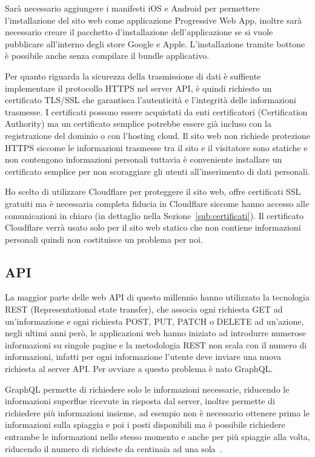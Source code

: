 Sar\`a necessario aggiungere i manifesti iOS e Android per permettere l'installazione del sito web come applicazione Progressive Web App, inoltre sar\`a necessario creare il pacchetto d'installazione dell'applicazione se si vuole pubblicare all'interno degli store Google e Apple. L'installazione tramite bottone \`e possibile anche senza compilare il bundle applicativo.

Per quanto riguarda la sicurezza della trasmissione di dati \`e suffiente implementare il protocollo HTTPS nel server API, \`e quindi richiesto un certificato TLS/SSL che garantisca l'autenticit\`a e l'integrit\`a delle informazioni trasmesse. I certificati possono essere acquistati da enti certificatori (Certification Authority) ma un certificato semplice potrebbe essere gi\`a incluso con la registrazione del dominio o con l'hosting cloud. Il sito web non richiede protezione HTTPS siccome le informazioni trasmesse tra il sito e il visitatore sono statiche e non contengono informazioni personali tuttavia \`e conveniente installare un certificato semplice per non scoraggiare gli utenti all'inserimento di dati personali.

Ho scelto di utilizzare Cloudflare per proteggere il sito web, offre certificati SSL gratuiti ma \`e necessaria completa fiducia in Cloudflare siccome hanno accesso alle comunicazioni in chiaro (in dettaglio nella Sezione~\ref{sub:certificati}). Il certificato Cloudflare verr\`a usato solo per il sito web statico che non contiene informazioni personali quindi non costituisce un problema per noi.

\subsection{API}%
\label{sub:api}

La maggior parte delle web API di questo millennio hanno utilizzato la tecnologia REST (Representational state transfer), che associa ogni richiesta GET ad un'informazione e ogni richiesta POST, PUT, PATCH o DELETE ad un'azione, negli ultimi anni per\`o, le applicazioni web hanno iniziato ad introdurre numerose informazioni su singole pagine e la metodologia REST non scala con il numero di informazioni, infatti per ogni informazione l'utente deve inviare una nuova richiesta al server API\@. Per ovviare a questo problema \`e nato GraphQL\@.

GraphQL permette di richiedere solo le informazioni necessarie, riducendo le informazioni superflue ricevute in risposta dal server, inoltre permette di richiedere pi\`u informazioni insieme, ad esempio non \`e necessario ottenere prima le informazioni sulla spiaggia e poi i posti disponibili ma \`e possibile richiedere entrambe le informazioni nello stesso momento e anche per pi\`u spiaggie alla volta, riducendo il numero di richieste da centinaia ad una sola~\cite{graphql-website}.

